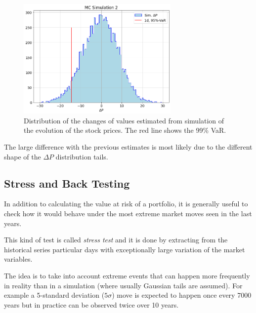 \begin{figure}[htb]
\centering
\includegraphics[width=0.7\textwidth]{figures/sim2_var}
\caption{Distribution of the changes of values estimated from simulation of the evolution of the stock prices. The red line shows the 99\% VaR.}
\label{fig:mc2_var}
\end{figure}

The large difference with the previous estimates is most likely due to the different shape of the $\Delta P$ distribution tails.

\subsection{Stress and Back Testing}
\label{stress-testing-and-back-testing}

In addition to calculating the value at risk of a portfolio, it is generally useful to check how it would behave under the most extreme market moves seen in the last years.

This kind of test is called \emph{stress test} and it is done by extracting from the historical series particular days with exceptionally large variation of the market variables.
 
The idea is to take into account extreme events that can happen more frequently in reality than in a simulation (where usually Gaussian tails are assumed). For example a 5-standard deviation ($5\sigma$) move is expected to happen once every 7000 years but in practice can be observed twice over 10 years.

